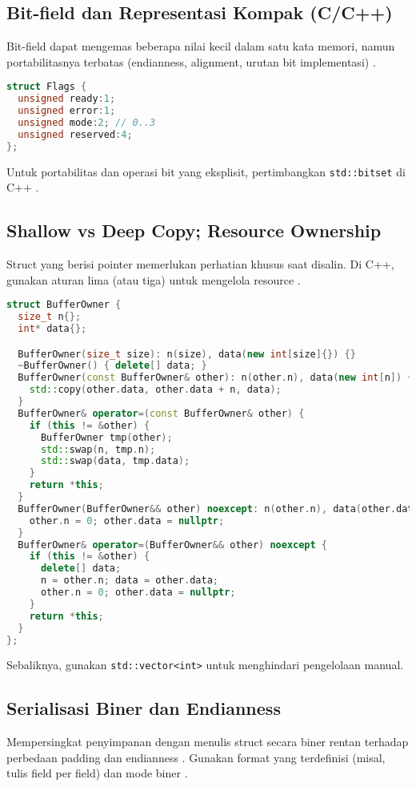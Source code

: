 \documentclass[../main.tex]{subfiles}
\begin{document}
\subsection{Bit-field dan Representasi Kompak (C/C++)}
Bit-field dapat mengemas beberapa nilai kecil dalam satu kata memori, namun portabilitasnya terbatas (endianness, alignment, urutan bit implementasi) \parencite{c-bitfield,cpp-bitfield}.

\begin{lstlisting}[language=C, caption={Bit-field untuk flags (C)}]
struct Flags {
  unsigned ready:1;
  unsigned error:1;
  unsigned mode:2; // 0..3
  unsigned reserved:4;
};
\end{lstlisting}

Untuk portabilitas dan operasi bit yang eksplisit, pertimbangkan \texttt{std::bitset} di C++ \parencite{cpp-bitset}.

\subsection{Shallow vs Deep Copy; Resource Ownership}
Struct yang berisi pointer memerlukan perhatian khusus saat disalin. Di C++, gunakan aturan lima (atau tiga) untuk mengelola resource \parencite{cpp-special-member-functions}.

\begin{lstlisting}[language=C++, caption={Aturan lima untuk kepemilikan resource}]
struct BufferOwner {
  size_t n{};
  int* data{};

  BufferOwner(size_t size): n(size), data(new int[size]{}) {}
  ~BufferOwner() { delete[] data; }
  BufferOwner(const BufferOwner& other): n(other.n), data(new int[n]) {
    std::copy(other.data, other.data + n, data);
  }
  BufferOwner& operator=(const BufferOwner& other) {
    if (this != &other) {
      BufferOwner tmp(other);
      std::swap(n, tmp.n);
      std::swap(data, tmp.data);
    }
    return *this;
  }
  BufferOwner(BufferOwner&& other) noexcept: n(other.n), data(other.data) {
    other.n = 0; other.data = nullptr;
  }
  BufferOwner& operator=(BufferOwner&& other) noexcept {
    if (this != &other) {
      delete[] data;
      n = other.n; data = other.data;
      other.n = 0; other.data = nullptr;
    }
    return *this;
  }
};
\end{lstlisting}

Sebaliknya, gunakan \texttt{std::vector<int>} untuk menghindari pengelolaan manual.

\subsection{Serialisasi Biner dan Endianness}
Mempersingkat penyimpanan dengan menulis struct secara biner rentan terhadap perbedaan padding dan endianness \parencite{endianness-wiki}. Gunakan format yang terdefinisi (misal, tulis field per field) dan mode biner \parencite{c-fwrite,cpp-openmode-binary}.
\end{document}
